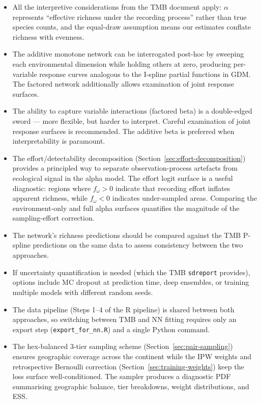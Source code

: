 \documentclass{article}
\begin{document}
\begin{itemize}
    \item All the interpretive considerations from the TMB document apply: $\alpha$ represents ``effective richness under the recording process'' rather than true species counts, and the equal-draw assumption means our estimates conflate richness with evenness.
    \item The additive monotone network can be interrogated post-hoc by sweeping each environmental dimension while holding others at zero, producing per-variable response curves analogous to the I-spline partial functions in GDM. The factored network additionally allows examination of joint response surfaces.
    \item The ability to capture variable interactions (factored beta) is a double-edged sword --- more flexible, but harder to interpret. Careful examination of joint response surfaces is recommended. The additive beta is preferred when interpretability is paramount.
    \item The effort/detectability decomposition (Section~\ref{sec:effort-decomposition}) provides a principled way to separate observation-process artefacts from ecological signal in the alpha model. The effort logit surface is a useful diagnostic: regions where $f_\omega > 0$ indicate that recording effort inflates apparent richness, while $f_\omega < 0$ indicates under-sampled areas. Comparing the environment-only and full alpha surfaces quantifies the magnitude of the sampling-effort correction.
    \item The network's richness predictions should be compared against the TMB P-spline predictions on the same data to assess consistency between the two approaches.
    \item If uncertainty quantification is needed (which the TMB \texttt{sdreport} provides), options include MC dropout at prediction time, deep ensembles, or training multiple models with different random seeds.
    \item The data pipeline (Steps 1--4 of the R pipeline) is shared between both approaches, so switching between TMB and NN fitting requires only an export step (\texttt{export\_for\_nn.R}) and a single Python command.
    \item The hex-balanced 3-tier sampling scheme (Section~\ref{sec:pair-sampling}) ensures geographic coverage across the continent while the IPW weights and retrospective Bernoulli correction (Section~\ref{sec:training-weights}) keep the loss surface well-conditioned. The sampler produces a diagnostic PDF summarising geographic balance, tier breakdowns, weight distributions, and ESS.

\end{itemize}
\end{document}
